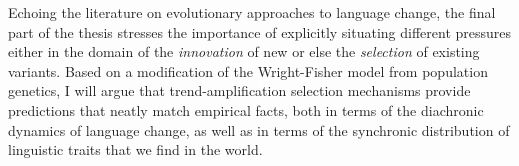 Echoing the literature on evolutionary approaches to language change, the final part of the thesis stresses the importance of explicitly situating different pressures either in the domain of the \emph{innovation} of new or else the \emph{selection} of existing variants. Based on a modification of the Wright-Fisher model from population genetics,
I will argue that trend-amplification selection mechanisms provide predictions that neatly match empirical facts, both in terms of the diachronic dynamics of language change, as well as in terms of the synchronic distribution of linguistic traits that we find in the world.

